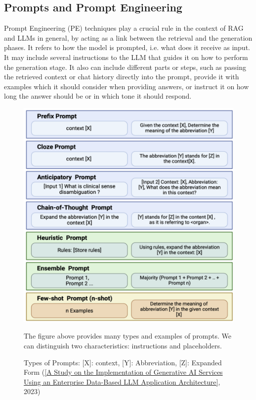 \subsection{Prompts and Prompt Engineering}
Prompt Engineering (PE) techniques play a crucial rule in the context of RAG and LLMs in general, by acting as a link between the retrieval and the generation phases. It refers to how the model is prompted, i.e. what does it receive as input. It may include several instructions to the LLM that guides it on how to perform the generation stage. It also can include different parts or steps, such as passing the retrieved context or chat history directly into the prompt, provide it with examples which it should consider when providing answers, or instruct it on how long the answer should be or in which tone it should respond.
\begin{figure}[H]
    \centering
    \includegraphics[width=\linewidth]{./figures/prompt-types.png}
    \caption{Types of Prompts: [X]: context, [Y]: Abbreviation, [Z]: Expanded Form
    (\href{https://www.oajaiml.com/uploads/archivepdf/63501191.pdf}{[A Study on the Implementation of Generative AI Services Using an Enterprise Data-Based LLM Application Architecture]}, 2023)}
    \begin{flushleft}
        The figure above provides many types and examples of prompts. We can distinguish two characteristics: instructions and placeholders.\newline

\end{flushleft}
\end{figure}
